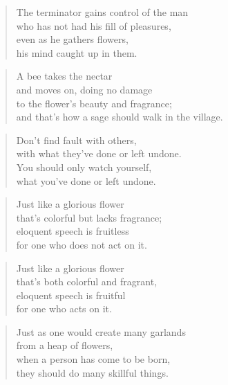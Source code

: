 \documentclass[12pt,openany]{book}%
\begin{document}
\begin{verse}%
The terminator gains control of the man \\
who has not had his fill of pleasures, \\
even as he gathers flowers, \\
his mind caught up in them. 

%
\end{verse}

\begin{verse}%
A bee takes the nectar \\
and moves on, doing no damage \\
to the flower’s beauty and fragrance; \\
and that’s how a sage should walk in the village. 

%
\end{verse}

\begin{verse}%
Don’t find fault with others, \\
with what they’ve done or left undone. \\
You should only watch yourself, \\
what you’ve done or left undone. 

%
\end{verse}

\begin{verse}%
Just like a glorious flower \\
that’s colorful but lacks fragrance; \\
eloquent speech is fruitless \\
for one who does not act on it. 

%
\end{verse}

\begin{verse}%
Just like a glorious flower \\
that’s both colorful and fragrant, \\
eloquent speech is fruitful \\
for one who acts on it. 

%
\end{verse}

\begin{verse}%
Just as one would create many garlands \\
from a heap of flowers, \\
when a person has come to be born, \\
they should do many skillful things. 

%
\end{verse}
\end{document}
